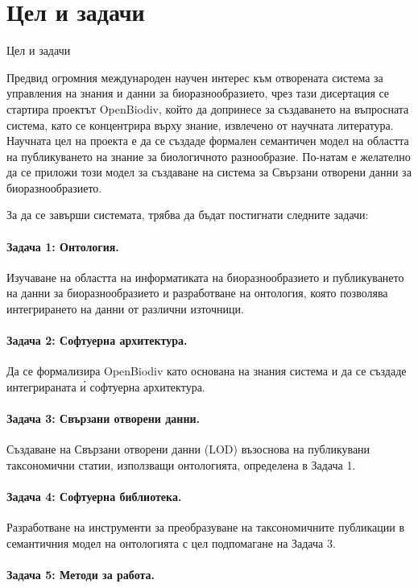 \section*{Цел и задачи}
 {Цел и задачи}

Предвид огромния международен научен интерес към отворената система за управления на знания и данни за биоразнообразието, чрез тази дисертация се стартира проектът OpenBiodiv, който да допринесе за създаването на въпросната система, като се концентрира върху знание, извлечено от научната литература. Научната цел на проекта е да се създаде формален семантичен модел на областта на публикуването на знание за биологичното разнообразие. По-натам е желателно да се приложи този модел за създаване на система за Свързани отворени данни за биоразнообразието.

За да се завърши системата, трябва да бъдат постигнати следните задачи:

\paragraph{Задача 1: Онтология.} Изучаване на областта на информатиката на биоразнообразието и публикуването на данни за биоразнообразието и разработване на онтология, която позволява интегрирането на данни от различни източници.

\paragraph{Задача 2: Софтуерна архитектура.} Да се формализира OpenBiodiv като основана на знания система и да се създаде интегрираната \'{и} софтуерна архитектура.

\paragraph{Задача 3: Свързани отворени данни.} Създаване на Свързани отворени данни (LOD) възоснова на публикувани таксономични статии, използващи онтологията, определена в Задача 1.

\paragraph{Задача 4: Софтуерна библиотека.} Разработване на инструменти за преобразуване на таксономичните публикации в семантичния модел на онтологията с цел подпомагане на Задача 3.

\paragraph{Задача 5: Методи за работа.}

